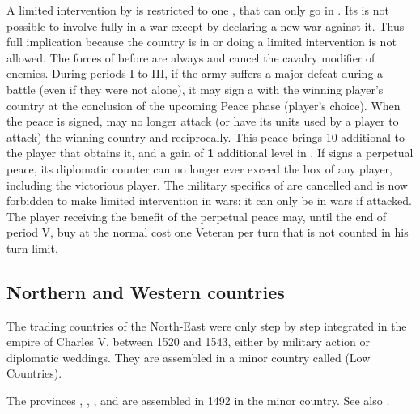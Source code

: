 \bparag A limited intervention by  is restricted to one
\ARMY\faceplus, that can only go in .
\bparag Its is not possible to involve fully  in a war
except by declaring a new war against it. Thus full implication because
the country is in \EW or doing a limited intervention is not allowed.
The forces of  before \TBAR are always  and
cancel the cavalry modifier of enemies.
During periods I to III, if the  army suffers a major
defeat during a battle (even if they were not alone), it may sign a
 with the winning player's country at the
conclusion of the upcoming Peace phase (player's choice).
\bparag When the peace is signed,  may no longer attack (or
have its units used by a player to attack) the winning country and
reciprocally.
\bparag This peace brings 10 additional \VP to the player that obtains
it, and a gain of {\bf 1} additional level in \STAB.
\bparag If  signs a perpetual peace, its diplomatic counter
can no longer ever exceed the \MA box of any player, including the
victorious player. The military specifics of  are cancelled
and  is now forbidden to make limited intervention in wars:
it can only be in wars if attacked.
\bparag The player receiving the benefit of the perpetual peace may,
until the end of period V, buy at the normal cost one Veteran \LD per
turn that is not counted in his turn limit.


\subsection{Northern and Western countries}
\label{chSpecific:Belgium}
\begin{designnote}
  The trading countries of the North-East were only step by step
  integrated in the empire of Charles V, between 1520 and 1543, either
  by military action or diplomatic weddings. They are assembled in a
  minor country called  (Low Countries).
\end{designnote}
\aparag The provinces , ,
,  and 
are assembled in 1492 in the  minor country. See also
.

